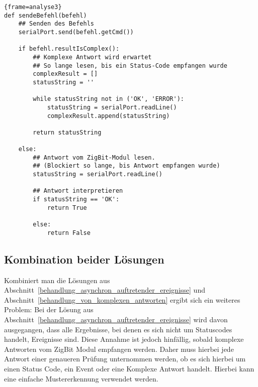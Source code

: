             \begin{lstlisting}{frame=analyse3}
def sendeBefehl(befehl)
    ## Senden des Befehls
    serialPort.send(befehl.getCmd())

    if befehl.resultIsComplex():
        ## Komplexe Antwort wird erwartet
        ## So lange lesen, bis ein Status-Code empfangen wurde
        complexResult = []
        statusString = ''

        while statusString not in ('OK', 'ERROR'):
            statusString = serialPort.readLine()
            complexResult.append(statusString)

        return statusString

    else:
        ## Antwort vom ZigBit-Modul lesen.
        ## (Blockiert so lange, bis Antwort empfangen wurde)
        statusString = serialPort.readLine()

        ## Antwort interpretieren
        if statusString == 'OK':
            return True
        
        else:
            return False

            \end{lstlisting}

        \subsection{Kombination beider Lösungen}

        Kombiniert man die Lösungen aus Abschnitt~\ref{behandlung_asynchron_auftretender_ereignisse} und 
        Abschnitt~\ref{behandlung_von_komplexen_antworten} ergibt sich ein weiteres Problem: Bei der
        Lösung aus Abschnitt~\ref{behandlung_asynchron_auftretender_ereignisse} wird davon ausgegangen, 
        dass alle Ergebnisse, bei denen es sich nicht um Statuscodes handelt, Ereignisse sind. Diese Annahme
        ist jedoch hinfällig, sobald komplexe Antworten vom ZigBit Modul empfangen werden. Daher muss hierbei
        jede Antwort einer genaueren Prüfung unternommen werden, ob es sich hierbei um einen Status Code, 
        ein Event oder eine Komplexe Antwort handelt. Hierbei kann eine einfache Mustererkennung verwendet
        werden.


